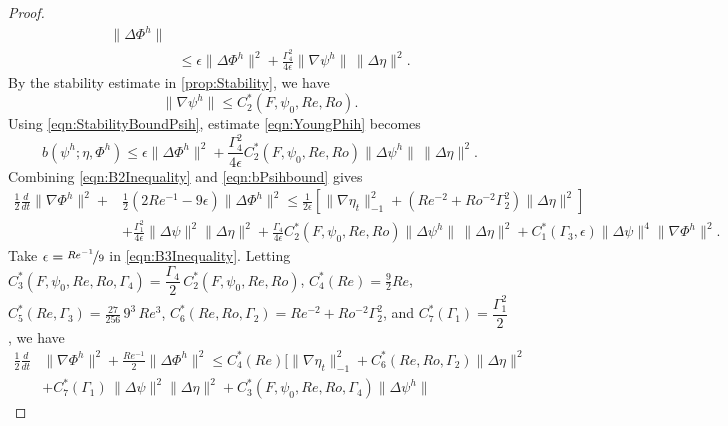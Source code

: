\begin{proof}
\begin{align}
      \|\Delta \Phi^h\| \nonumber \\
    &\le \epsilon \|\Delta \Phi^h\|^2 + \frac{\Gamma_4^2}{4\epsilon}
      \|\nabla \psi^h\|\, \|\Delta \eta\|^2. \label{eqn:YoungPhih}
  \end{align}
  By the stability estimate in \autoref{prop:Stability}, we have
  \begin{equation}
    \|\nabla \psi^h\| \le C^*_2(F,\psi_0, Re, Ro).
    \label{eqn:StabilityBoundPsih}
  \end{equation}
  Using \eqref{eqn:StabilityBoundPsih}, estimate \eqref{eqn:YoungPhih} becomes
  \begin{equation}
    b(\psi^h; \eta, \Phi^h) \le \epsilon \|\Delta \Phi^h\|^2 +
      \frac{\Gamma_4^2}{4\epsilon} C^*_2(F,\psi_0,Re,Ro) \|\Delta \psi^h\|\,
      \|\Delta \eta\|^2.
    \label{eqn:bPsihbound}
  \end{equation}
  Combining \eqref{eqn:B2Inequality} and \eqref{eqn:bPsihbound} gives
  \begin{equation}
    \begin{split}
      \frac{1}{2} \frac{d}{dt} \|\nabla \Phi^h\|^2 + &\frac{1}{2}\left(2Re^{-1} -
        9 \epsilon \right)
        \|\Delta \Phi^h\|^2 \le \frac{1}{2 \epsilon}\left[\|\nabla \eta_t\|_{-1}^2
        + \left( Re^{-2} + Ro^{-2} \Gamma_2^2 \right) \|\Delta \eta\|^2\right] \\
      & + \frac{\Gamma_1^2}{4 \epsilon} \|\Delta \psi\|^2 \|\Delta \eta\|^2
        + \frac{\Gamma_4}{4\epsilon}C^*_2(F,\psi_0,Re,Ro) \|\Delta \psi^h\|\,
        \|\Delta \eta\|^2 + C^*_1(\Gamma_3,\epsilon) \|\Delta \psi\|^4 \|\nabla \Phi^h\|^2.
    \end{split}
    \label{eqn:B3Inequality}
  \end{equation}
  Take $\epsilon = \nicefrac{Re^{-1}}{9}$ in \eqref{eqn:B3Inequality}.
  Letting
  $C^*_3(F,\psi_0,Re,Ro,\Gamma_4) = \dfrac{\Gamma_4}{2}\, C^*_2(F,\psi_0,Re,Ro)$,
  $C^*_4(Re) = \frac{9}{2} Re$, $C^*_5(Re,\Gamma_3)=\frac{27}{256}\,9^3\,Re^{3}$,
  $C^*_6(Re,Ro,\Gamma_2) = Re^{-2} + Ro^{-2}\Gamma_2^2$, and $C^*_7(\Gamma_1) = \dfrac{\Gamma_1^2}{2}$,
  we have
  \begin{equation}
    \begin{split}
      \frac{1}{2} \frac{d}{dt} &\|\nabla \Phi^h\|^2
        + \frac{Re^{-1}}{2} \|\Delta \Phi^h\|^2
        \le C^*_4(Re) \biggl[\|\nabla \eta_t\|_{-1}^2
        + C^*_6(Re, Ro,\Gamma_2) \|\Delta \eta\|^2 \\
      & + C^*_7(\Gamma_1)\, \|\Delta \psi\|^2 \|\Delta \eta\|^2
        + C^*_3(F,\psi_0,Re,Ro,\Gamma_4) \|\Delta \psi^h\|\,

\end{split}
\end{equation}
\end{proof}
